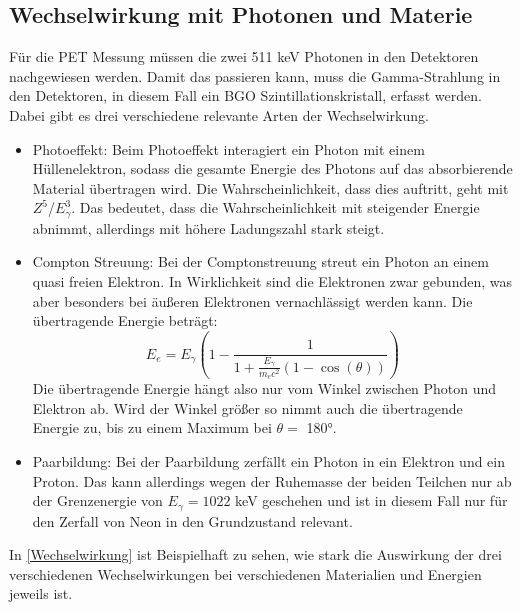 \subsection{Wechselwirkung mit Photonen und Materie}
Für die PET Messung müssen die zwei 511 keV Photonen in den Detektoren nachgewiesen werden. Damit das passieren kann, muss die Gamma-Strahlung in den Detektoren, in diesem Fall ein BGO Szintillationskristall, erfasst werden. Dabei gibt es drei verschiedene relevante Arten der Wechselwirkung.

\begin{itemize}  
	\item Photoeffekt: Beim Photoeffekt interagiert ein Photon mit einem Hüllenelektron, sodass die gesamte Energie des Photons auf  das absorbierende Material übertragen wird. Die Wahrscheinlichkeit, dass dies auftritt, geht mit $Z^{5}$/$E_{\gamma}^{3}$. Das bedeutet, dass die Wahrscheinlichkeit mit steigender Energie abnimmt, allerdings mit höhere Ladungszahl stark steigt.
	\item Compton Streuung: Bei der Comptonstreuung streut ein Photon an einem quasi freien Elektron. In Wirklichkeit sind die Elektronen zwar gebunden, was aber besonders bei äußeren Elektronen vernachlässigt werden kann. Die übertragende Energie beträgt:
	\begin{equation}
	E_e = E_\gamma \left( 1-\frac{1}{1 + \frac{E_\gamma}{m_ec^2}\left( 1-\cos\left(\theta\right)\right)}\right)
	\label{eq:compton}
	\end{equation}
	Die übertragende Energie hängt also nur vom Winkel zwischen Photon und Elektron ab. Wird der Winkel größer so nimmt auch die übertragende Energie zu, bis zu einem Maximum bei $\theta =$ 180°. 
	\item Paarbildung: Bei der Paarbildung zerfällt ein Photon in ein Elektron und ein Proton. Das kann allerdings wegen der Ruhemasse der beiden Teilchen nur ab der Grenzenergie von $E_{\gamma} = 1022$ keV geschehen und ist in diesem Fall nur für den Zerfall von Neon in den Grundzustand relevant.
\end{itemize}
In \cref{Wechselwirkung} ist Beispielhaft zu sehen, wie stark die Auswirkung der drei verschiedenen Wechselwirkungen bei verschiedenen Materialien und Energien jeweils ist.


